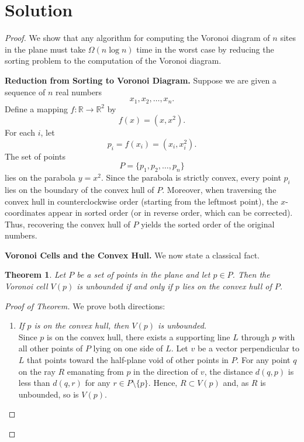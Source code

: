 \documentclass[12pt]{article}
\newtheorem{theorem}{Theorem}
\begin{document}
\section*{Solution}

\begin{proof}
We show that any algorithm for computing the Voronoi diagram of \(n\) sites in the plane must take \(\Omega(n \log n)\) time in the worst case by reducing the sorting problem to the computation of the Voronoi diagram.

\medskip
\noindent\textbf{Reduction from Sorting to Voronoi Diagram.}  
Suppose we are given a sequence of \(n\) real numbers 
\[
x_1, x_2, \dots, x_n.
\]
Define a mapping \(f : \mathbb{R} \to \mathbb{R}^2\) by
\[
f(x) = (x, x^2).
\]
For each \(i\), let
\[
p_i = f(x_i) = (x_i, x_i^2).
\]
The set of points 
\[
P = \{p_1, p_2, \dots, p_n\}
\]
lies on the parabola \(y = x^2\). Since the parabola is strictly convex, every point \(p_i\) lies on the boundary of the convex hull of \(P\). Moreover, when traversing the convex hull in counterclockwise order (starting from the leftmost point), the \(x\)-coordinates appear in sorted order (or in reverse order, which can be corrected). Thus, recovering the convex hull of \(P\) yields the sorted order of the original numbers.

\medskip
\noindent\textbf{Voronoi Cells and the Convex Hull.}  
We now state a classical fact.

\begin{theorem}
Let \(P\) be a set of points in the plane and let \(p \in P\). Then the Voronoi cell \(V(p)\) is unbounded if and only if \(p\) lies on the convex hull of \(P\).
\end{theorem}

\begin{proof}[Proof of Theorem]
We prove both directions:

\begin{enumerate}[label=\textbf{(\arabic*)}]
    \item \emph{If \(p\) is on the convex hull, then \(V(p)\) is unbounded.}\\[1mm]
    Since \(p\) is on the convex hull, there exists a supporting line \(L\) through \(p\) with all other points of \(P\) lying on one side of \(L\). Let \(v\) be a vector perpendicular to \(L\) that points toward the half-plane void of other points in \(P\). For any point \(q\) on the ray \(R\) emanating from \(p\) in the direction of \(v\), the distance \(d(q,p)\) is less than \(d(q,r)\) for any \(r \in P\setminus\{p\}\). Hence, \(R \subset V(p)\) and, as \(R\) is unbounded, so is \(V(p)\).
    

\end{enumerate}
\end{proof}
\end{proof}
\end{document}
